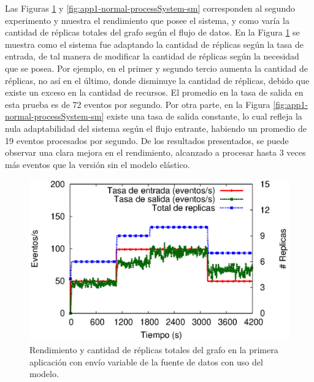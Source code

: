 Las Figuras \ref{fig:app1-normal-processSystem-cm} y \ref{fig:app1-normal-processSystem-sm} \normalsize{corresponden al segundo experimento y muestra el rendimiento que posee el sistema, y como var\'ia la cantidad de r\'eplicas totales del grafo seg\'un el flujo de datos.} En la Figura \ref{fig:app1-normal-processSystem-cm} \normalsize{se muestra como el sistema fue adaptando la cantidad de r\'eplicas seg\'un la tasa de entrada, de tal manera de modificar la cantidad de r\'eplicas seg\'un la necesidad que se posea. Por ejemplo, en el primer y segundo tercio aumenta la cantidad de r\'eplicas, no as\'i en el \'ultimo, donde disminuye la cantidad de r\'eplicas, debido que existe un exceso en la cantidad de recursos. El promedio en la tasa de salida en esta prueba es de 72 eventos por segundo.} Por otra parte, en la Figura \ref{fig:app1-normal-processSystem-sm} \normalsize{existe una tasa de salida constante, lo cual refleja la nula adaptabilidad del sistema seg\'un el flujo entrante, habiendo un promedio de 19 eventos procesados por segundo. De los resultados presentados, se puede observar una clara mejora en el rendimiento, alcanzado a procesar hasta 3 veces m\'as eventos que la versi\'on sin el modelo el\'astico.}

\begin{figure}[!ht]
	\centering
	\includegraphics[scale=0.7]{images/exp/app1/normal/cm/processSystem.eps}
    \caption{Rendimiento y cantidad de r\'eplicas totales del grafo en la primera aplicaci\'on con env\'io variable de la fuente de datos con uso del modelo.}
	\label{fig:app1-normal-processSystem-cm}
\end{figure}

